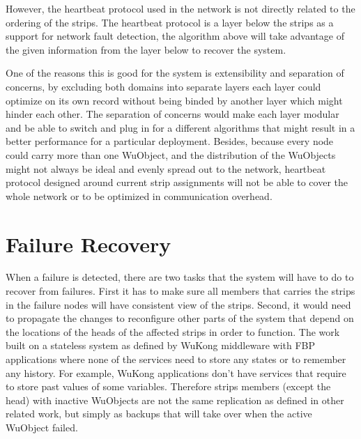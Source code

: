 However, the heartbeat protocol used in the network is not directly related to
the ordering of the strips. The heartbeat protocol is a layer below the strips
as a support for network fault detection, the algorithm above will take
advantage of the given information from the layer below to recover the system.

One of the reasons this is good for the system is extensibility and
separation of concerns, by excluding both domains into separate layers each
layer could optimize on its own record without being binded by another layer
which might hinder each other. The separation of concerns would make each layer
modular and be able to switch and plug in for a different algorithms that might
result in a better performance for a particular deployment. Besides, because
every node could carry more than one WuObject, and the distribution of the
WuObjects might not always be ideal and evenly spread out to the network,
heartbeat protocol designed around current strip assignments will not
be able to cover the whole network or to be optimized in communication overhead.

\section{Failure Recovery}
\label{s:fr}

When a failure is detected, there are two tasks that the system will have to do
to recover from failures. First it has to make sure all members that carries
the strips in the failure nodes will have consistent view of the strips.
Second, it would need to propagate the changes to reconfigure other parts of
the system that depend on the locations of the heads of the affected strips in
order to function. The work built on a stateless system as defined by WuKong
middleware with FBP applications where none of the services need to store any
states or to remember any history. For example, WuKong applications don't have
services that require to store past values of some variables. Therefore strips
members (except the head) with inactive WuObjects are not the same replication
as defined in other related work, but simply as backups that will take over
when the active WuObject failed.




